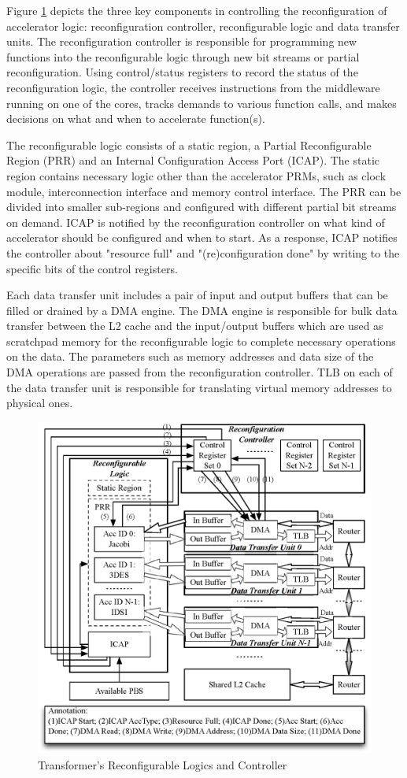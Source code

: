 Figure \ref{fig_reconfig_controller} depicts the three key components
in controlling the reconfiguration of accelerator logic:
reconfiguration controller, reconfigurable logic and data transfer
units. The reconfiguration controller is responsible for programming
new functions into the reconfigurable logic through new bit streams or
partial reconfiguration. Using control/status registers to record the
status of the reconfiguration logic, the controller receives
instructions from the middleware running on one of the cores, tracks
demands to various function calls, and makes decisions on what and
when to accelerate function(s).

The reconfigurable logic consists of a static region, a Partial
Reconfigurable Region (PRR) and an Internal Configuration Access Port
(ICAP). The static region contains necessary logic other than the
accelerator PRMs, such as clock module, interconnection interface and
memory control interface. The PRR can be divided into smaller
sub-regions and configured with different partial bit streams on
demand. ICAP is notified by the reconfiguration controller on what
kind of accelerator 
should be configured and when to start. As a response, ICAP notifies
the controller about "resource full" and "(re)configuration done" by
writing to the specific bits of the control registers.

Each data transfer unit includes a pair of input and output buffers
that can be filled or drained by a DMA engine. The DMA engine is
responsible for bulk data transfer between the L2 cache and the
input/output buffers which are used as scratchpad memory for the
reconfigurable logic to complete necessary operations on the data. The
parameters such as memory addresses and data size of the DMA
operations are passed from the reconfiguration controller. TLB on each
of the data transfer unit is responsible for translating virtual
memory addresses to physical ones.


\begin{figure}
    \centering
    \includegraphics[width=4.0 in]{HPCA14-Controller}
    \caption{Transformer's Reconfigurable Logics and Controller}
    \label{fig_reconfig_controller}
\vspace{-0.05in}
\end{figure}


